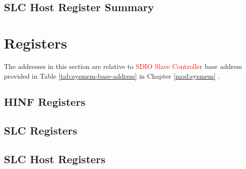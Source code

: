 \documentclass[main\_\_EN.tex]{subfiles}
\begin{document}
\subsection{SLC Host Register Summary}
\label{sec:sdioslave-slc-host-reg-summ}





\clearpage
\section{Registers}

The addresses in this section are relative to \textcolor{red}{SDIO Slave Controller} base address provided in Table \ref{tab:sysmem-base-address} in Chapter \ref{mod:sysmem} \textit{}.

\subsection{HINF Registers}
\label{sec:sdioslave-hinf-reg}



\subsection{SLC Registers}
\label{sec:sdioslave-slc-reg}



\subsection{SLC Host Registers}
\label{sec:sdioslave-slc-host-reg}


\end{document}
